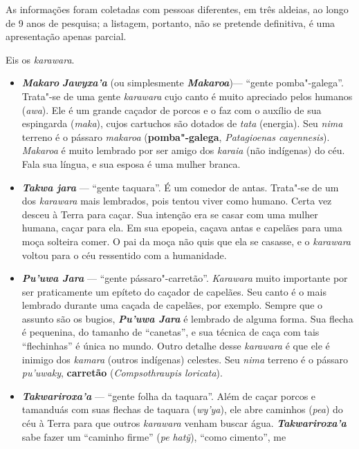 As informações foram coletadas com pessoas diferentes, em três aldeias,
ao longo de 9 anos de pesquisa; a listagem, portanto, não se pretende
definitiva, é uma apresentação apenas parcial.

Eis os \emph{karawara}.

\begin{itemize}
\item
  \emph{\textbf{Makaro}} \emph{\textbf{Jawyxa'a}} (ou simplesmente
  \emph{\textbf{Makaroa}})--- ``gente pomba"-galega''. Trata"-se de uma
  gente \emph{karawara} cujo canto é muito apreciado pelos humanos
  (\emph{awa}). Ele é um grande caçador de porcos e o faz com o auxílio
  de sua espingarda (\emph{maka}), cujos cartuchos são dotados de
  \emph{tata} (energia). Seu \emph{nima} terreno é o pássaro
  \emph{makaroa} (\textbf{pomba"-galega}, \emph{Patagioenas cayennesis}).
  \emph{Makaroa} é muito lembrado por ser amigo dos \emph{karaia} (não
  indígenas) do céu. Fala sua língua, e sua esposa é uma mulher branca.
\item
  \emph{\textbf{Takwa jara}} --- ``gente taquara''. É um comedor de antas.
  Trata"-se de um dos \emph{karawara} mais lembrados, pois tentou viver
  como humano. Certa vez desceu à Terra para caçar. Sua intenção era se
  casar com uma mulher humana, caçar para ela. Em sua epopeia, caçava
  antas e capelães para uma moça solteira comer. O pai da moça não quis
  que ela se casasse, e o \emph{karawara} voltou para o céu ressentido
  com a humanidade.
\item
  \emph{\textbf{Pu'uwa Jara}} --- ``gente pássaro"-carretão''.
  \emph{Karawara} muito importante por ser praticamente um epíteto do
  caçador de capelães. Seu canto é o mais lembrado durante uma caçada de
  capelães, por exemplo. Sempre que o assunto são os bugios,
  \textbf{\emph{Pu'uwa Jara}} é lembrado de alguma forma. Sua flecha é
  pequenina, do tamanho de ``canetas'', e sua técnica de caça com tais
  ``flechinhas'' é única no mundo. Outro detalhe desse \emph{karawara} é
  que ele é inimigo dos \emph{kamara} (outros indígenas) celestes. Seu
  \emph{nima} terreno é o pássaro \emph{pu'uwaky}, \textbf{carretão}
  (\emph{Compsothraupis loricata}).
\item
  \emph{\textbf{Takwariroxa'a}} --- ``gente folha da taquara''. Além de
  caçar porcos e tamanduás com suas flechas de taquara (\emph{wy'ya}),
  ele abre caminhos (\emph{pea}) do céu à Terra para que outros
  \emph{karawara} venham buscar água. \emph{\textbf{Takwariroxa'a}} sabe
  fazer um ``caminho firme'' (\emph{pe} \emph{hatỹ}), ``como cimento'', me

\end{itemize}
